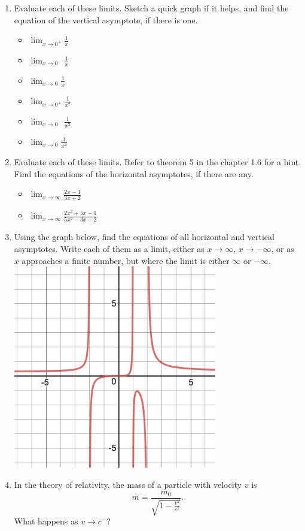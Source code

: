 \documentclass[11pt]{article}
\begin{document}
\begin{enumerate}
\item Evaluate each of these limits. Sketch a quick graph if it helps, and find the equation of the vertical asymptote, if there is one.
\begin{multicols}{2}
\begin{itemize}
    \item $\lim_{x\rightarrow 0^+} \frac{1}{x}$
    \item $\lim_{x\rightarrow 0^-} \frac{1}{x}$
    \item $\lim_{x\rightarrow 0} \frac{1}{x}$
    \item $\lim_{x\rightarrow 0^+} \frac{1}{x^2}$
    \item $\lim_{x\rightarrow 0^-} \frac{1}{x^2}$
    \item $\lim_{x\rightarrow 0} \frac{1}{x^2}$
\end{itemize}
\end{multicols}
\item Evaluate each of these limits. Refer to theorem 5 in the chapter 1.6 for a hint. Find the equations of the horizontal asymptotes, if there are any.
\begin{itemize}
    \item $\lim_{x \rightarrow \infty} \frac{2x-1}{3x+2}$
    \item $\lim_{x \rightarrow \infty} \frac{2x^2 + 5x -1}{5x^2 - 3x + 2}$
\end{itemize}
\item Using the graph below, find the equations of all horizontal and vertical asymptotes. Write each of them as a limit, either as $x \rightarrow \infty$, $x \rightarrow -\infty$, or as $x$ approaches a finite number, but where the limit is either $\infty $ or $-\infty$.\\
\includegraphics[width=0.7\textwidth]{Asymptotes.png}
\item In the theory of relativity, the mass of a particle with velocity $v$ is  
$$m = \frac{m_0}{\sqrt{1 - \frac{v^2}{c^2}}}.$$
What happens as $v \rightarrow c^-$?
\end{enumerate}
\end{document}

